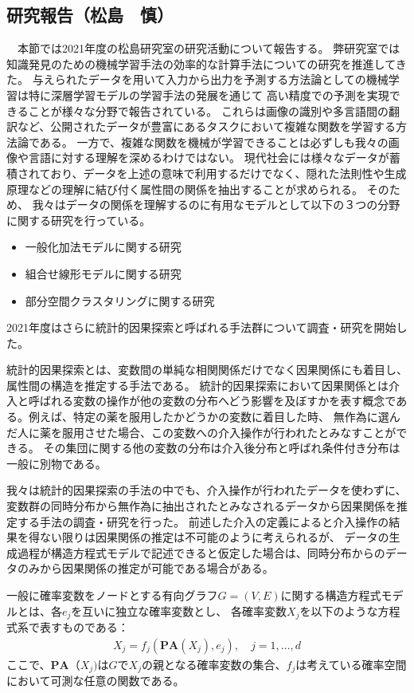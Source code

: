 \subsection{研究報告（松島　慎）}

　本節では2021年度の松島研究室の研究活動について報告する。
弊研究室では知識発見のための機械学習手法の効率的な計算手法についての研究を推進してきた。
与えられたデータを用いて入力から出力を予測する方法論としての機械学習は特に深層学習モデルの学習手法の発展を通じて
高い精度での予測を実現できることが様々な分野で報告されている。
これらは画像の識別や多言語間の翻訳など、公開されたデータが豊富にあるタスクにおいて複雑な関数を学習する方法論である。
一方で、複雑な関数を機械が学習できることは必ずしも我々の画像や言語に対する理解を深めるわけではない。
現代社会には様々なデータが蓄積されており、データを上述の意味で利用するだけでなく、隠れた法則性や生成原理などの理解に結び付く属性間の関係を抽出することが求められる。
そのため、
我々はデータの関係を理解するのに有用なモデルとして以下の３つの分野に関する研究を行っている。
\begin{itemize}
    \item 一般化加法モデルに関する研究
    \item 組合せ線形モデルに関する研究
    \item 部分空間クラスタリングに関する研究
\end{itemize}
2021年度はさらに統計的因果探索と呼ばれる手法群について調査・研究を開始した。

統計的因果探索とは、変数間の単純な相関関係だけでなく因果関係にも着目し、属性間の構造を推定する手法である。
統計的因果探索において因果関係とは介入と呼ばれる変数の操作が他の変数の分布へどう影響を及ぼすかを表す概念である。例えば、特定の薬を服用したかどうかの変数に着目した時、
無作為に選んだ人に薬を服用させた場合、この変数への介入操作が行われたとみなすことができる。
その集団に関する他の変数の分布は介入後分布と呼ばれ条件付き分布は一般に別物である。

我々は統計的因果探索の手法の中でも、介入操作が行われたデータを使わずに、変数群の同時分布から無作為に抽出されたとみなされるデータから因果関係を推定する手法の調査・研究を行った。
前述した介入の定義によると介入操作の結果を得ない限りは因果関係の推定は不可能のように考えられるが、
データの生成過程が構造方程式モデルで記述できると仮定した場合は、同時分布からのデータのみから因果関係の推定が可能である場合がある。

一般に確率変数をノードとする有向グラフ$G=(V,E)$に関する構造方程式モデルとは、各$e_j$を互いに独立な確率変数とし、
各確率変数$X_{j}$を以下のような方程式系で表すものである：
\begin{align*}
    X_{j}=f_{j}\left(\mathbf{PA}(X_{j}), e_{j}\right), \quad j=1, \ldots, d
\end{align*}
ここで、$\mathbf{PA}（X_j)$は$G$で$X_j$の親となる確率変数の集合、$f_j$は考えている確率空間において可測な任意の関数である。

